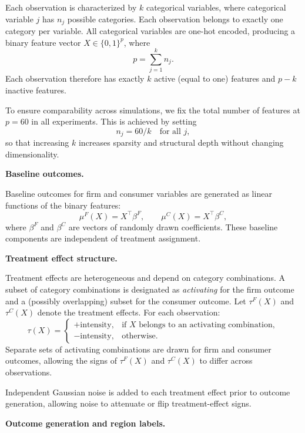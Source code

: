 \documentclass[11pt,letterpaper,english]{article}
\theoremstyle{definition}
\theoremstyle{definition}
\begin{document}
\begin{bibunit}
Each observation is characterized by $k$ categorical variables, where categorical variable $j$ has $n_j$ possible categories. Each observation belongs to exactly one category per variable. All categorical variables are one-hot encoded, producing a binary feature vector $X \in \{0,1\}^p$, where
\[
p = \sum_{j=1}^k n_j.
\]
Each observation therefore has exactly $k$ active (equal to one) features and $p-k$ inactive features.

To ensure comparability across simulations, we fix the total number of features at $p=60$ in all experiments. This is achieved by setting
\[
n_j = 60 / k \quad \text{for all } j,
\]
so that increasing $k$ increases sparsity and structural depth without changing dimensionality.

\vspace{6pt}

\noindent
\textbf{Baseline outcomes.}

Baseline outcomes for firm and consumer variables are generated as linear functions of the binary features:
\[
\mu^F(X) = X^\top \beta^F, \qquad \mu^C(X) = X^\top \beta^C,
\]
where $\beta^F$ and $\beta^C$ are vectors of randomly drawn coefficients. These baseline components are independent of treatment assignment.

\vspace{6pt}

\noindent
\textbf{Treatment effect structure.}

Treatment effects are heterogeneous and depend on category combinations. A subset of category combinations is designated as \emph{activating} for the firm outcome and a (possibly overlapping) subset for the consumer outcome. Let $\tau^F(X)$ and $\tau^C(X)$ denote the treatment effects. For each observation:
\[
\tau(X) =
\begin{cases}
+\text{intensity}, & \text{if } X \text{ belongs to an activating combination}, \\
-\text{intensity}, & \text{otherwise}.
\end{cases}
\]
Separate sets of activating combinations are drawn for firm and consumer outcomes, allowing the signs of $\tau^F(X)$ and $\tau^C(X)$ to differ across observations.

Independent Gaussian noise is added to each treatment effect prior to outcome generation, allowing noise to attenuate or flip treatment-effect signs.

\vspace{6pt}

\noindent
\textbf{Outcome generation and region labels.}


\end{bibunit}
\end{document}

